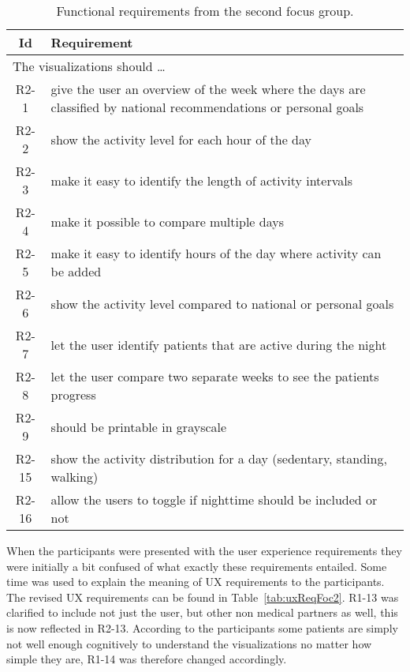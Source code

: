 \begin{table}[h!]
  \begin{center}
  \begin{tabular}{|c|p{12cm}|}
    \hline
      \textbf{Id} & \textbf{Requirement} \\ \hline
    \multicolumn{2}{|l|}{The visualizations should \ldots} \\ \hline
      R2-1 & give the user an overview of the week where the days are classified by national recommendations or personal goals \\ \hline
      R2-2 & show the activity level for each hour of the day \\ \hline
      R2-3 & make it easy to identify the length of activity intervals \\ \hline
      R2-4 & make it possible to compare multiple days \\ \hline
      R2-5 & make it easy to identify hours of the day where activity can be added \\ \hline
      R2-6 & show the activity level compared to national or personal goals \\ \hline
      R2-7 & let the user identify patients that are active during the night \\ \hline
      R2-8 & let the user compare two separate weeks to see the patients progress \\ \hline
      R2-9 & should be printable in grayscale \\ \hline
      R2-15 & show the activity distribution for a day (sedentary, standing, walking) \\ \hline
      R2-16 & allow the users to toggle if nighttime should be included or not \\ \hline
  \end{tabular}
  \end{center}
  \caption[Functional requirements after the second focus group]{Functional requirements from the second focus group.}
  \label{tab:reqFoc2}
\end{table}

When the participants were presented with the user experience requirements they were initially a bit confused of what exactly these requirements entailed. Some time was used to explain the meaning of UX requirements to the participants. The revised UX requirements can be found in Table~\ref{tab:uxReqFoc2}. R1-13 was clarified to include not just the user, but other non medical partners as well, this is now reflected in R2-13. According to the participants some patients are simply not well enough cognitively to understand the visualizations no matter how simple they are, R1-14 was therefore changed accordingly.

